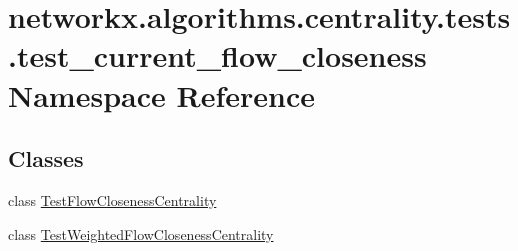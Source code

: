 \hypertarget{namespacenetworkx_1_1algorithms_1_1centrality_1_1tests_1_1test__current__flow__closeness}{}\section{networkx.\+algorithms.\+centrality.\+tests.\+test\+\_\+current\+\_\+flow\+\_\+closeness Namespace Reference}
\label{namespacenetworkx_1_1algorithms_1_1centrality_1_1tests_1_1test__current__flow__closeness}
\subsection*{Classes}
\begin{DoxyCompactItemize}
\item 
class \hyperlink{classnetworkx_1_1algorithms_1_1centrality_1_1tests_1_1test__current__flow__closeness_1_1TestFlowClosenessCentrality}{Test\+Flow\+Closeness\+Centrality}
\item 
class \hyperlink{classnetworkx_1_1algorithms_1_1centrality_1_1tests_1_1test__current__flow__closeness_1_1TestWeightedFlowClosenessCentrality}{Test\+Weighted\+Flow\+Closeness\+Centrality}
\end{DoxyCompactItemize}
